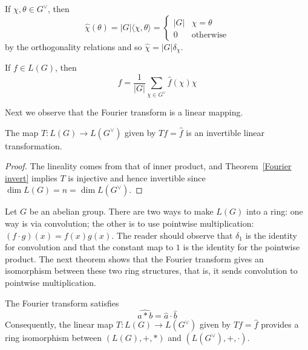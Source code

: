 \begin{example}
If $\chi,\theta\in G^\vee$, then
\[\widehat{\chi}(\theta)=|G|\langle\chi,\theta\rangle=\begin{cases}
|G|&\chi=\theta\\
0&\text{otherwise}
\end{cases}\]
by the orthogonality relations and so $\widehat{\chi}=|G|\delta_\chi$.
\end{example}
\begin{theorem}\label{Fourier invert}
If $f\in L(G)$, then
\[f=\frac{1}{|G|}\sum_{\chi\in G^\vee}\widehat{f}(\chi)\chi\]
\end{theorem}
Next we observe that the Fourier transform is a linear mapping.
\begin{proposition}\label{Fourier invert linear}
The map $T:L(G)\to L(G^\vee)$ given by $Tf=\widehat{f}$ is an invertible linear transformation.
\end{proposition}
\begin{proof}
The lineality comes from that of inner product, and Theorem~\ref{Fourier invert} implies $T$ is injective and hence invertible since $\dim L(G)=n=\dim L(G^\vee)$.
\end{proof}
Let $G$ be an abelian group. There are two ways to make $L(G)$ into a ring: one way is via convolution; the other is to use pointwise multiplication: $(f\cdot g)(x)=f(x)g(x)$. The reader should observe that $\delta_1$ is the identity for convolution and that the constant map to $1$ is the identity for the pointwise product. The next theorem shows that the Fourier transform gives an isomorphism between these two ring structures, that is, it sends convolution to pointwise multiplication.
\begin{theorem}\label{Convolution theorem}
The Fourier transform satisfies
\[\widehat{a\ast b}=\widehat{a}\cdot\widehat{b}\]
Consequently, the linear map $T:L(G)\to L(G^\vee)$ given by $Tf=\widehat{f}$ provides a ring isomorphism between $(L(G),+,\ast)$ and $(L(G^\vee),+,\cdot)$.
\end{theorem}
